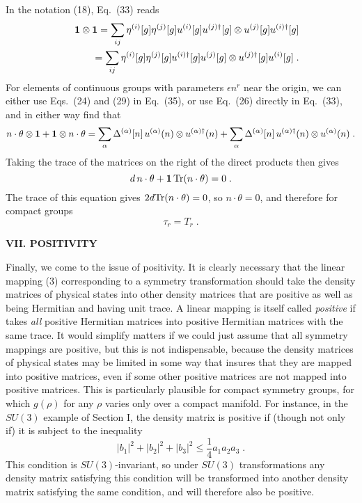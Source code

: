 \documentclass[12pt]{article}
\def\BM#1{\mbox{\boldmath{$#1$}}}
\begin{document}
In the notation (18), Eq.~(33)  reads
\begin{eqnarray}
&&{\BM 1}\otimes {\BM 1}=\sum_{ij}\eta^{(i)}[g]\eta^{(j)}[g]u^{(i)}[g]u^{(j)\dagger}[g]\otimes u^{(j)}[g]u^{(i)\dagger}[g]\nonumber\\&&~~~~~~~
=\sum_{ij}\eta^{(i)}[g]\eta^{(j)}[g]u^{(i)\dagger}[g]u^{(j)}[g]\otimes u^{(j)\dagger}[g]u^{(i)}[g]\;.
\end{eqnarray}
For elements of continuous groups with parameters $\epsilon n^r$ near the origin, we can either use Eqs.~(24) and (29) in Eq.~(35), or use Eq.~(26) directly in Eq.~(33), and in either way find that 
\begin{equation}
n\cdot \theta\otimes {\BM 1}+{\BM 1}\otimes n\cdot \theta=\sum_\alpha \Delta^{(\alpha)}[n]\,u^{(\alpha)}(n)\otimes u^{(\alpha)\dagger}(n)
+\sum_\alpha \Delta^{(\alpha)}[n]\,u^{(\alpha)\dagger}(n)\otimes u^{(\alpha)}(n)\;.
\end{equation}
Taking the trace of the matrices on the right of the direct products then gives
$$
d\,n\cdot \theta+{\BM 1}\,{\rm Tr}(n\cdot \theta)=0\;.
$$
The trace of this equation gives $2d{\rm Tr}(n\cdot \theta)=0$, so $n\cdot \theta=0$, and therefore for compact groups 
\begin{equation}
\tau_r=T_r\;.
\end{equation}


\begin{center}
{\bf VII. POSITIVITY}
\end{center}

Finally, we come to the  issue of positivity.  It is clearly necessary that the linear mapping (3) corresponding to a symmetry transformation should take the density matrices of physical states into other density matrices that are positive as well as being Hermitian and having unit trace.  A linear mapping is itself called {\em positive} if takes {\em all} positive Hermitian matrices into positive Hermitian matrices with the same trace.  It would simplify matters if we could just assume that all symmetry mappings are positive, but this is not indispensable, because the density matrices of physical states may be limited in some way that insures that they are mapped into positive matrices, even if some other positive matrices are not mapped into positive matrices.  This is particularly plausible for compact symmetry groups, for which $g(\rho)$ for any $\rho$ varies only over a compact manifold.   For instance, in the $SU(3)$ example of Section I, the density matrix is positive if
(though not only if) it is subject to the inequality
$$ |b_1|^2+|b_2|^2+|b_3|^2\leq \frac{1}{4}a_1 a_2 a_3\;.$$
This condition is $SU(3)$-invariant, so under $SU(3)$ transformations any density matrix satisfying  this condition will be transformed into another density matrix satisfying the same condition, and will therefore  also be positive.
\end{document}
